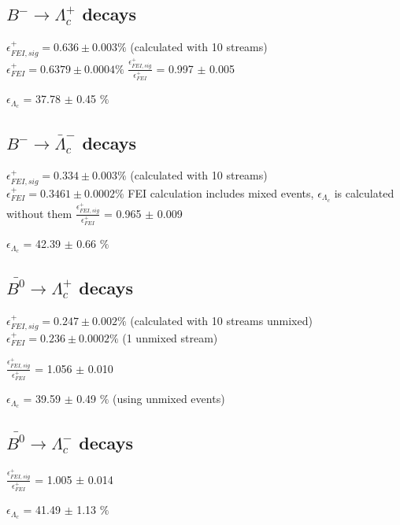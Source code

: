 \subsection{$B^- \rightarrow \Lambda_c^+$ decays}
$\epsilon^+_{FEI,sig} = 0.636 \pm 0.003\%$ (calculated with 10 streams)\\
$\epsilon^+_{FEI} = 0.6379 \pm 0.0004\%$
$\frac{\epsilon^+_{FEI,sig}}{\epsilon^+_{FEI}}$ = 0.997 $\pm $ 0.005%

$\epsilon_{\Lambda_c}$ = 37.78 $\pm $ 0.45 $\%$ %

\subsection{$B^- \rightarrow \bar{\Lambda}_c^-$ decays}
$\epsilon^+_{FEI,sig} = 0.334 \pm 0.003\%$ (calculated with 10 streams)\\
$\epsilon^+_{FEI} = 0.3461 \pm 0.0002\%$
FEI calculation includes mixed events, $\epsilon_{\Lambda_c}$ is calculated without them
$\frac{\epsilon^+_{FEI,sig}}{\epsilon^+_{FEI}}$ = 0.965 $\pm $ 0.009%

$\epsilon_{\Lambda_c}$ = 42.39 $\pm $ 0.66 $\%$ %


\subsection{$\bar{B^0} \rightarrow \Lambda_c^+$  decays}
$\epsilon^+_{FEI,sig} = 0.247 \pm 0.002\%$ (calculated with  10 streams unmixed)\\
$\epsilon^+_{FEI} = 0.236 \pm 0.0002\%$ (1 unmixed stream)

$\frac{\epsilon^+_{FEI,sig}}{\epsilon^+_{FEI}}$ = 1.056 $\pm$ 0.010%

$\epsilon_{\Lambda_c}$ = 39.59 $\pm $ 0.49 $\%$ %
 (using unmixed events)

\subsection{$\bar{B^0} \rightarrow \Lambda_c^-$  decays}


$\frac{\epsilon^+_{FEI,sig}}{\epsilon^+_{FEI}}$ = 1.005 $\pm$ 0.014%

$\epsilon_{\Lambda_c}$ = 41.49  $\pm $ 1.13 $\%$ %